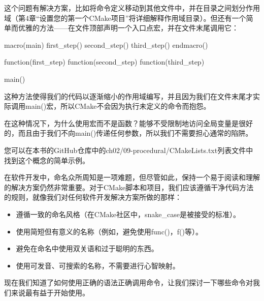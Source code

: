 这个问题有解决方案，比如将命令定义移动到其他文件中，并在目录之间划分作用域（第4章“设置您的第一个CMake项目”将详细解释作用域目录）。但还有一个简单而优雅的方法——在文件顶部声明一个入口点宏，并在文件末尾调用它：

\begin{cmake}
macro(main)
    first_step()
    second_step()
    third_step()
endmacro()

function(first_step)
function(second_step)
function(third_step)

main()
\end{cmake}

这种方法使得我们的代码以逐渐缩小的作用域编写，并且因为我们在文件末尾才实际调用main()宏，所以CMake不会因为执行未定义的命令而抱怨。

在这种情况下，为什么使用宏而不是函数？能够不受限制地访问全局变量是很好的，而且由于我们不向main()传递任何参数，所以我们不需要担心通常的陷阱。

您可以在本书的GitHub仓库中的ch02/09-procedural/CMakeLists.txt列表文件中找到这个概念的简单示例。


在软件开发中，命名众所周知是一项难题，但尽管如此，保持一个易于阅读和理解的解决方案仍然非常重要。对于CMake脚本和项目，我们应该遵循干净代码方法的规则，就像我们对任何软件开发解决方案所做的那样：

\begin{itemize}
\item
遵循一致的命名风格（在CMake社区中，snake\_case是被接受的标准）。

\item
使用简短但有意义的名称（例如，避免使用func()，f()等）。

\item
 避免在命名中使用双关语和过于聪明的东西。

\item
使用可发音、可搜索的名称，不需要进行心智映射。
\end{itemize}

现在我们知道了如何使用正确的语法正确调用命令，让我们探讨一下哪些命令对我们来说最有益于开始使用。



















